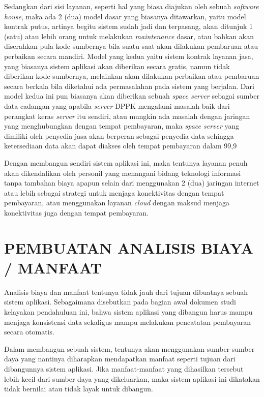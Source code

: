 \documentclass[pdftex, 12pt, oneside]{article}
\begin{document}
Sedangkan dari sisi layanan, seperti hal yang biasa diajukan oleh sebuah \textit{software house}, maka ada 2 (dua) model dasar yang biasanya ditawarkan, yaitu model kontrak putus, artinya begitu sistem sudah jadi dan terpasang, akan ditunjuk 1 (satu) atau lebih orang untuk melakukan \textit{maintenance} dasar, atau bahkan akan diserahkan pula kode sumbernya bila suatu saat akan dilakukan pembaruan atau perbaikan secara mandiri. Model yang kedua yaitu sistem kontrak layanan jasa, yang biasanya sistem aplikasi akan diberikan secara gratis, namun tidak diberikan kode sumbernya, melainkan akan dilakukan perbaikan atau pembaruan secara berkala bila diketahui ada permasalahan pada sistem yang berjalan. Dari model kedua ini pun biasanya akan diberikan sebuah \textit{space server} sebagai sumber data cadangan yang apabila \textit{server} DPPK mengalami masalah baik dari perangkat keras \textit{server} itu sendiri, atau mungkin ada masalah dengan jaringan yang menghubungkan dengan tempat pembayaran, maka \textit{space server} yang dimiliki oleh penyedia jasa akan berperan sebagai penyedia data sehingga ketersediaan data akan dapat diakses oleh tempat pembayaran dalam 99,9%

Dengan membangun sendiri sistem aplikasi ini, maka tentunya layanan penuh akan dikendalikan oleh personil yang menangani bidang teknologi informasi tanpa tambahan biaya apapun selain dari menggunakan 2 (dua) jaringan internet atau lebih sebagai strategi untuk menjaga konektivitas dengan tempat pembayaran, atau menggunakan layanan \textit{cloud} dengan maksud menjaga konektivitas juga dengan tempat pembayaran.


\section{PEMBUATAN ANALISIS BIAYA / MANFAAT}

Analisis biaya dan manfaat tentunya tidak jauh dari tujuan dibuatnya sebuah sistem aplikasi. Sebagaimana disebutkan pada bagian awal dokumen studi kelayakan pendahuluan ini, bahwa sistem aplikasi yang dibangun harus mampu menjaga konsistensi data sekaligus mampu melakukan pencatatan pembayaran secara otomatis.

Dalam membangun sebuah sistem, tentunya akan menggunakan sumber-sumber daya yang nantinya diharapkan mendapatkan manfaat seperti tujuan dari dibangunnya sistem aplikasi. Jika manfaat-manfaat yang dihasilkan tersebut lebih kecil dari sumber daya yang dikeluarkan, maka sistem aplikasi ini dikatakan tidak bernilai atau tidak layak untuk dibangun.
\end{document}
